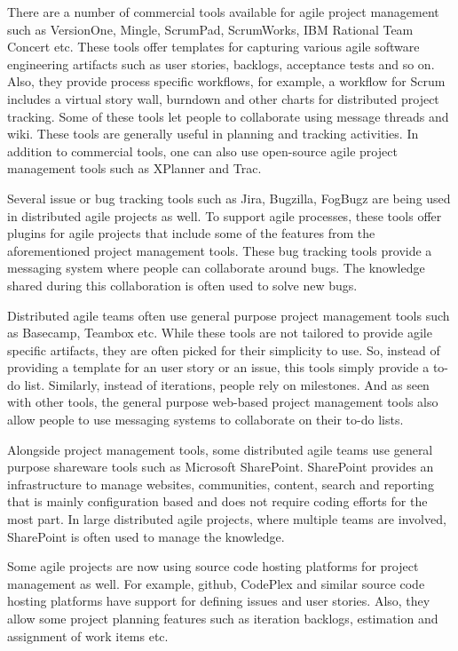There are a number of commercial tools available for agile project management such as VersionOne\cite{version_one}, Mingle\cite{mingle}, ScrumPad\cite{scrum_pad}, ScrumWorks\cite{scrum_works}, IBM Rational Team Concert\cite{ibm_rtc} etc. These tools offer templates for capturing various agile software engineering artifacts such as user stories, backlogs, acceptance tests and so on. Also, they provide process specific workflows, for example, a workflow for Scrum includes a virtual story wall, burndown and other charts for distributed project tracking. Some of these tools let people to collaborate using message threads and wiki. These tools are generally useful in planning and tracking activities. In addition to commercial tools, one can also use open-source agile project management tools such as XPlanner\cite{xplanner} and Trac\cite{trac}.

Several issue or bug tracking tools such as Jira\cite{jira}, Bugzilla\cite{bugzilla}, FogBugz\cite{fog_bugz} are being used in distributed agile projects as well. To support agile processes, these tools offer plugins for agile projects that include some of the features from the aforementioned project management tools. These bug tracking tools provide a messaging system where people can collaborate around bugs. The knowledge shared during this collaboration is often used to solve new bugs\cite{issue_tracking}.

Distributed agile teams often use general purpose project management tools such as Basecamp\cite{basecamp}, Teambox\cite{team_box} etc. While these tools are not tailored to provide agile specific artifacts, they are often picked for their simplicity to use. So, instead of providing a template for an user story or an issue, this tools simply provide a to-do list. Similarly, instead of iterations, people rely on milestones. And as seen with other tools, the general purpose web-based project management tools also allow people to use messaging systems to collaborate on their to-do lists.

Alongside project management tools, some distributed agile teams use general purpose shareware tools such as Microsoft SharePoint\cite{share_point}. SharePoint provides an infrastructure to manage websites, communities, content, search and reporting that is mainly configuration based and does not require coding efforts for the most part. In large distributed agile projects, where multiple teams are involved, SharePoint is often used to manage the knowledge.

Some agile projects are now using source code hosting platforms for project management as well. For example, github\cite{github}, CodePlex\cite{codeplex} and similar source code hosting platforms have support for defining issues and user stories. Also, they allow some project planning features such as iteration backlogs, estimation and assignment of work items etc.

